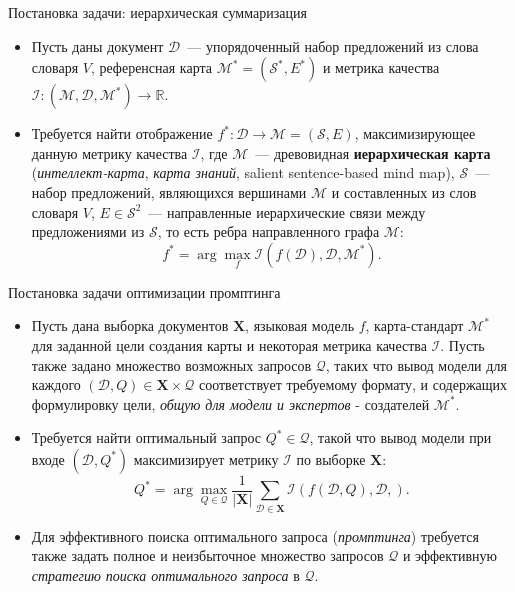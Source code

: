 \documentclass{beamer}
\newcommand{\Q}{\mathcal{Q}}
\newcommand{\D}{\mathcal{D}}
\renewcommand{\S}{\mathcal{S}}
\newcommand{\X}{\mathbf{X}}
\newcommand{\I}{\mathcal{I}}
\newcommand{\M}{\mathcal{M}}
\newcommand{\R}{\mathbb{R}}
\begin{document}

\begin{frame}{Постановка задачи: иерархическая суммаризация}

\begin{itemize}
    \item Пусть даны документ $\D$~--- упорядоченный набор предложений из слова словаря $V$, референсная карта $\M^* = (\S^*, E^*)$ и метрика качества $\I: (\M, \D, \M^*) \rightarrow \R$.
    \item Требуется найти отображение $f^*: \D \rightarrow \M = (\S, E)$, максимизирующее данную метрику качества $\I$, где $\M$~--- древовидная \textbf{иерархическая карта} (\textit{интеллект-карта}, \textit{карта знаний}, salient sentence-based mind map), $\S$~--- набор предложений, являющихся вершинами $\M$ и составленных из слов словаря $V$, $E\in \S^2$~--- направленные иерархические связи между предложениями из $\S$, то есть ребра направленного графа $\M$:
$$
f^* = \arg\max\limits_{f} \I(f(\D), \D, \M^*).
$$
\end{itemize}

\end{frame}


\begin{frame}{Постановка задачи оптимизации промптинга}

\begin{itemize}
    \item Пусть дана выборка документов $\X$, языковая модель $f$, карта-стандарт $\M^*$ для заданной цели создания карты и некоторая метрика качества $\I$. Пусть также задано множество возможных запросов $\Q$, таких что вывод модели для каждого $(\D, Q)\in\X\times\Q$ соответствует требуемому формату, и содержащих формулировку цели, \textit{общую для модели и экспертов} - создателей $\M^*$.
    \item Требуется найти оптимальный запрос $Q^*\in\Q$, такой что вывод модели при входе $(\D, Q^*)$ максимизирует метрику $\I$ по выборке $\X$:
    $$
    Q^* = \arg\max\limits_{Q\in\Q} \frac{1}{|\X|}\sum\limits_{\D\in\X} \I(f(\D, Q), \D, ).
    $$
    \item Для эффективного поиска оптимального запроса (\textit{промптинга}) требуется также задать полное и неизбыточное множество запросов $\Q$ и эффективную \textit{стратегию поиска оптимального запроса} в $\Q$.
\end{itemize}

\end{frame}
\end{document}
